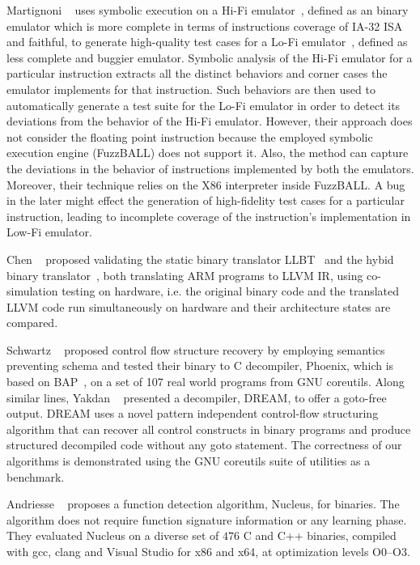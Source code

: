 Martignoni \etal~\cite{Martignoni:ASPLOS2012} uses symbolic execution on a
Hi-Fi emulator~\cite{Bochs1996}, defined as an binary emulator which is more
complete in terms of instructions coverage of IA-32 ISA and faithful, to
generate high-quality test cases for a Lo-Fi emulator~\cite{QEMU:USENIX05},
         defined as  less complete and buggier emulator. Symbolic analysis of
         the Hi-Fi emulator for a particular instruction extracts all the
         distinct behaviors and corner cases the emulator implements for that
         instruction. Such behaviors are then used to automatically generate  a
         test suite for the Lo-Fi emulator in order to  detect its deviations
         from the behavior of the Hi-Fi emulator. However, their approach does
         not consider the floating point instruction because the employed
         symbolic execution engine (FuzzBALL) does not support it. Also, the
         method can capture the deviations in the behavior of instructions
         implemented by both the emulators. Moreover, their technique relies on
         the X86 interpreter inside FuzzBALL. A bug in the later might effect
         the generation of high-fidelity test cases for a particular
         instruction, leading to incomplete coverage of the instruction's
         implementation in Low-Fi emulator.

Chen \etal~\cite{CLSS2015} proposed validating the static binary translator
LLBT~\cite{LLBT2012} and the hybid binary translator~\cite{LLVMDBT2012}, both
translating ARM programs to LLVM IR,  using co-simulation testing on hardware,
            i.e. the original binary code and the translated LLVM  code run
            simultaneously on hardware and their architecture states are
            compared.

Schwartz \etal~\cite{Schwartz:2013} proposed control flow structure recovery by
employing semantics preventing schema and tested their binary to C decompiler,
          Phoenix, which is based on BAP~\cite{BAP:CAV11}, on a set of 107 real
          world programs from GNU coreutils. Along similar lines, 
%
Yakdan \etal~\cite{Yakdan2015NDSS} presented a decompiler, DREAM, to offer a
goto-free output. DREAM uses a novel pattern independent control-flow
structuring algorithm that can recover all control constructs in binary
programs and produce structured decompiled code without any goto statement. The
correctness of our algorithms is demonstrated using the GNU coreutils suite of
utilities as a benchmark.

Andriesse \etal~\cite{nucleus2017EuroSP} proposes a function detection
algorithm, Nucleus, for binaries. The algorithm does not require function
signature information or any learning phase. They evaluated Nucleus on a
diverse set of $476$ C and C++ binaries, compiled with gcc, clang and Visual
Studio for x86 and x64, at optimization levels O0--O3. 
  
